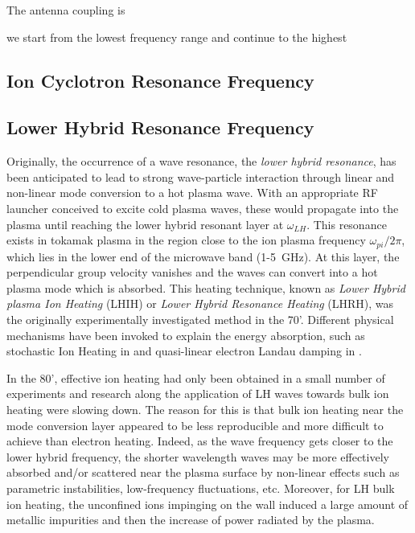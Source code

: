 The antenna coupling is 

we start from the lowest frequency range and continue to the highest



\subsection{Ion Cyclotron Resonance Frequency}


\subsection{Lower Hybrid Resonance Frequency}
Originally, the occurrence of a wave resonance, the \emph{lower hybrid resonance}, has been anticipated to lead to strong wave-particle interaction through linear and non-linear mode conversion to a hot plasma wave. With an appropriate RF launcher conceived to excite cold plasma waves, these would propagate into the plasma until reaching the lower hybrid resonant layer at $\omega_{LH}$. This resonance exists in tokamak plasma in the region close to the ion plasma frequency $\omega_{pi}/2\pi$, which lies in the lower end of the microwave band (1-5~GHz). At this layer, the perpendicular group velocity vanishes and the waves can convert into a hot plasma mode which is absorbed. This heating technique, known as \emph{Lower Hybrid plasma Ion Heating} (LHIH) or \emph{Lower Hybrid Resonance Heating} (LHRH), was the originally experimentally investigated method in the 70'. Different physical mechanisms have been invoked to explain the energy absorption, such as stochastic Ion Heating in  and quasi-linear electron Landau damping in .


In the 80', effective ion heating had only been obtained in a small number of experiments and research along the application of LH waves towards bulk ion heating were slowing down. The reason for this is that bulk ion heating near the mode conversion layer appeared to be less reproducible and more difficult to achieve than electron heating. Indeed, as the wave frequency gets closer to the lower hybrid frequency, the shorter wavelength waves may be more effectively absorbed and/or scattered near the plasma surface by non-linear effects such as parametric instabilities, low-frequency fluctuations, etc. Moreover, for LH bulk ion heating, the unconfined ions impinging on the wall induced a large amount of metallic impurities and then the increase of power radiated by the plasma.

